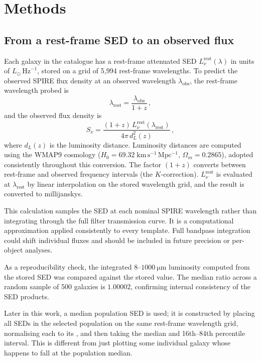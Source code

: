 \documentclass[12pt,a4paper]{article}
\begin{document}
\section{Methods}
\label{sec:methods}

\subsection{From a rest-frame SED to an observed flux}
\label{sec:methods:flux}

Each galaxy in the \popcosmos{} catalogue has a rest-frame attenuated SED
$L_\nu^\mathrm{rest}(\lambda)$ in units of $L_\odot\,\mathrm{Hz}^{-1}$, stored on a
grid of 5,994 rest-frame wavelengths. To predict the observed SPIRE flux density at an observed wavelength $\lambda_\mathrm{obs}$, the
rest-frame wavelength probed is
\begin{equation}
  \lambda_\mathrm{rest} = \frac{\lambda_\mathrm{obs}}{1+z}\,,
  \label{eq:restlam}
\end{equation}
and the observed flux density is
\begin{equation}
  S_\nu = \frac{(1+z)\,L_\nu^\mathrm{rest}(\lambda_\mathrm{rest})}
               {4\pi\,d_L^2(z)}\,,
  \label{eq:flux}
\end{equation}
where $d_L(z)$ is the luminosity distance. Luminosity distances are computed using the
WMAP9 cosmology ($H_0 = 69.32\;\mathrm{km\,s^{-1}\,Mpc^{-1}}$,
$\Omega_m = 0.2865$), adopted consistently throughout this conversion. The factor
$(1+z)$ converts between rest-frame and observed frequency
intervals (the $K$-correction). $L_\nu^\mathrm{rest}$ is evaluated at
$\lambda_\mathrm{rest}$ by linear interpolation on the stored wavelength grid, and the
result is converted to millijanskys.

This calculation samples the SED at each nominal SPIRE wavelength rather than integrating
through the full filter transmission curve. It is a computational approximation applied
consistently to every template. Full bandpass integration could shift individual fluxes
and should be included in future precision or per-object analyses.

As a reproducibility check, the integrated $8$--$\SI{1000}{\um}$ luminosity computed
from the stored SED was compared against the stored \LIR{} value. The median ratio
across a random sample of 500 galaxies is $1.00002$, confirming internal consistency of
the SED products.

Later in this work, a median population SED is used; it is constructed by placing
all SEDs in the selected population on the same rest-frame wavelength grid, normalising
each to its \LIR{}, and then taking the median and 16th--84th percentile
interval. This is different from just plotting some individual galaxy whose \LIR{} happens to
fall at the population median.
\end{document}
